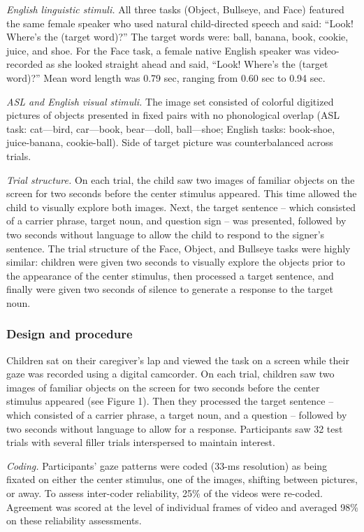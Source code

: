 \documentclass[english,floatsintext,man]{apa6}
\begin{document}
\emph{English linguistic stimuli.} All three tasks (Object, Bullseye,
and Face) featured the same female speaker who used natural
child-directed speech and said: \enquote{Look! Where's the (target
word)?} The target words were: ball, banana, book, cookie, juice, and
shoe. For the Face task, a female native English speaker was
video-recorded as she looked straight ahead and said, \enquote{Look!
Where's the (target word)?} Mean word length was 0.79 sec, ranging from
0.60 sec to 0.94 sec.

\emph{ASL and English visual stimuli.} The image set consisted of
colorful digitized pictures of objects presented in fixed pairs with no
phonological overlap (ASL task: cat---bird, car---book, bear---doll,
ball---shoe; English tasks: book-shoe, juice-banana, cookie-ball). Side
of target picture was counterbalanced across trials.

\emph{Trial structure.} On each trial, the child saw two images of
familiar objects on the screen for two seconds before the center
stimulus appeared. This time allowed the child to visually explore both
images. Next, the target sentence -- which consisted of a carrier
phrase, target noun, and question sign -- was presented, followed by two
seconds without language to allow the child to respond to the signer's
sentence. The trial structure of the Face, Object, and Bullseye tasks
were highly similar: children were given two seconds to visually explore
the objects prior to the appearance of the center stimulus, then
processed a target sentence, and finally were given two seconds of
silence to generate a response to the target noun.

\hypertarget{design-and-procedure}{%
\subsubsection{Design and procedure}\label{design-and-procedure}}

Children sat on their caregiver's lap and viewed the task on a screen
while their gaze was recorded using a digital camcorder. On each trial,
children saw two images of familiar objects on the screen for two
seconds before the center stimulus appeared (see Figure 1). Then they
processed the target sentence -- which consisted of a carrier phrase, a
target noun, and a question -- followed by two seconds without language
to allow for a response. Participants saw 32 test trials with several
filler trials interspersed to maintain interest.

\emph{Coding.} Participants' gaze patterns were coded (33-ms resolution)
as being fixated on either the center stimulus, one of the images,
shifting between pictures, or away. To assess inter-coder reliability,
25\% of the videos were re-coded. Agreement was scored at the level of
individual frames of video and averaged 98\% on these reliability
assessments.
\end{document}
